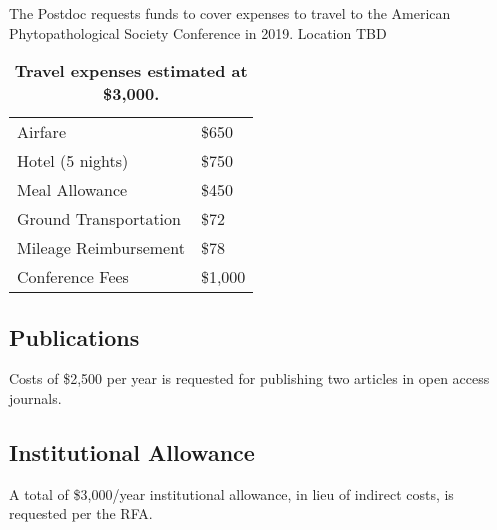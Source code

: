 \documentclass[12pt,letterpaper]{article}
\begin{document}
The Postdoc requests funds to cover expenses to travel to the American Phytopathological Society Conference in 2019.  Location TBD


\begin{table}[h!]
\centering
\begin{tabular}{ll}
\hline
	Airfare	& \$650 \\
	Hotel (5 nights) 	& \$750 \\
	Meal Allowance	& \$450 \\
	Ground Transportation	& \$72 \\
	Mileage Reimbursement	& \$78 \\
	Conference Fees	& \$1,000\\\hline
\end{tabular}
\caption{\textbf{Travel expenses estimated at \$3,000.}}
\end{table}


\subsection{Publications}
Costs of \$2,500 per year is requested for publishing two articles in open access journals.  

\subsection{Institutional Allowance}
A total of \$3,000/year institutional allowance, in lieu of indirect costs, is requested per the RFA.  
\end{document}
